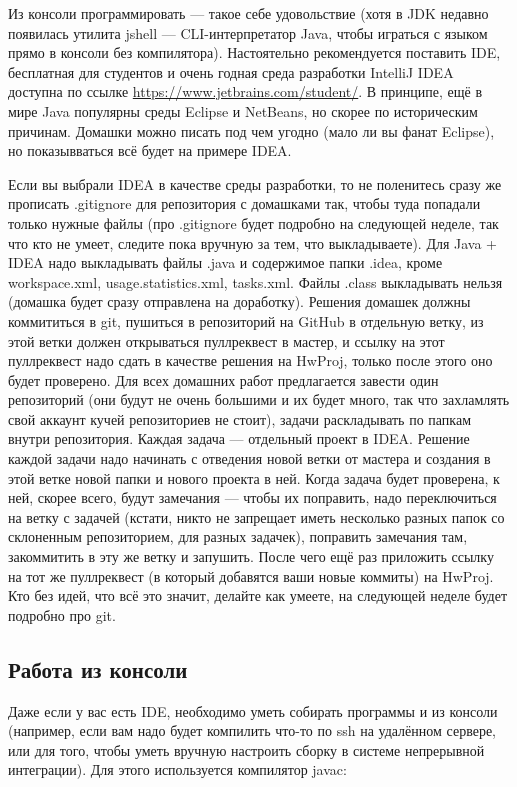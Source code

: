 \documentclass[a5paper]{article}
\begin{document}
Из консоли программировать --- такое себе удовольствие (хотя в JDK недавно появилась утилита jshell --- CLI-интерпретатор Java, чтобы играться с языком прямо в консоли без компилятора). Настоятельно рекомендуется поставить IDE, бесплатная для студентов и очень годная среда разработки IntelliJ IDEA доступна по ссылке \url{https://www.jetbrains.com/student/}. В принципе, ещё в мире Java популярны среды Eclipse и NetBeans, но скорее по историческим причинам. Домашки можно писать под чем угодно (мало ли вы фанат Eclipse), но показывваться всё будет на примере IDEA.

Если вы выбрали IDEA в качестве среды разработки, то не поленитесь сразу же прописать .gitignore для репозитория с домашками так, чтобы туда попадали только нужные файлы (про .gitignore будет подробно на следующей неделе, так что кто не умеет, следите пока вручную за тем, что выкладываете). Для Java + IDEA надо выкладывать файлы .java и содержимое папки .idea, кроме workspace.xml, usage.statistics.xml, tasks.xml. Файлы .class выкладывать нельзя (домашка будет сразу отправлена на доработку). Решения домашек должны коммититься в git, пушиться в репозиторий на GitHub в отдельную ветку, из этой ветки должен открываться пуллреквест в мастер, и ссылку на этот пуллреквест надо сдать в качестве решения на HwProj, только после этого оно будет проверено. Для всех домашних работ предлагается завести один репозиторий (они будут не очень большими и их будет много, так что захламлять свой аккаунт кучей репозиториев не стоит), задачи раскладывать по папкам внутри репозитория. Каждая задача --- отдельный проект в IDEA. Решение каждой задачи надо начинать с отведения новой ветки от мастера и создания в этой ветке новой папки и нового проекта в ней. Когда задача будет проверена, к ней, скорее всего, будут замечания --- чтобы их поправить, надо переключиться на ветку с задачей (кстати, никто не запрещает иметь несколько разных папок со склоненным репозиторием, для разных задачек), поправить замечания там, закоммитить в эту же ветку и запушить. После чего ещё раз приложить ссылку на тот же пуллреквест (в который добавятся ваши новые коммиты) на HwProj. Кто без идей, что всё это значит, делайте как умеете, на следующей неделе будет подробно про git.

\subsection{Работа из консоли}

Даже если у вас есть IDE, необходимо уметь собирать программы и из консоли (например, если вам надо будет компилить что-то по ssh на удалённом сервере, или для того, чтобы уметь вручную настроить сборку в системе непрерывной интеграции). Для этого используется компилятор javac:
\end{document}
